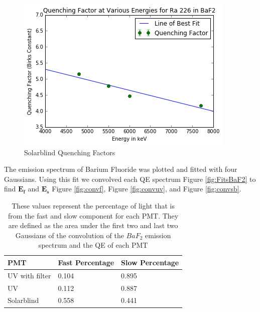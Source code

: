\begin{figure}
  \centering
    \includegraphics[width=.8\columnwidth]{qfsb.png}
  \caption{Solarblind Quenching Factors}
  \label{fig:qfsb}
\end{figure} 

The emission spectrum of Barium Fluoride was plotted and fitted with four Gaussians. Using this fit we convolved each QE spectrum Figure \ref{fig:FitsBaF2} to find $\bm{E_f}$ and $\bm{E_s}$ Figure \ref{fig:convf}, Figure \ref{fig:convuv}, and Figure \ref{fig:convsb}.

\begin{table}
    \begin{tabular}{ | l | l | p{2cm} |}
    \hline
    PMT & Fast Percentage & Slow Percentage\\ \hline

    UV with filter & 0.104 & 0.895\\ \hline  

    UV & 0.112 & 0.887\\ \hline

    Solarblind & 0.558 & 0.441\\ \hline
    \hline
    \end{tabular}
    \caption{These values represent the percentage of light that is from the fast and slow component for each PMT. They are defined as the area under the first two and last two Gaussians of the convolution of the $BaF_2$ emission spectrum and the QE of each PMT}
    \label{table:fastvsslow}
\end{table}

